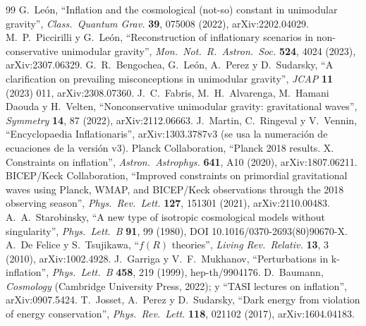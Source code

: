\documentclass[11pt,a4paper]{article}
\numberwithin{equation}{section}
\begin{document}
\begin{thebibliography}{99}
\small
{} G.~León, ``Inflation and the cosmological (not-so) constant in unimodular gravity'', \emph{Class.\ Quantum Grav.} \textbf{39}, 075008 (2022), arXiv:2202.04029.
 M.~P.~Piccirilli y G.~León, ``Reconstruction of inflationary scenarios in non-conservative unimodular gravity'', \emph{Mon.\ Not.\ R.\ Astron.\ Soc.} \textbf{524}, 4024 (2023), arXiv:2307.06329.
 G.~R.~Bengochea, G.~León, A.~Perez y D.~Sudarsky, ``A clarification on prevailing misconceptions in unimodular gravity'', \emph{JCAP} \textbf{11} (2023) 011, arXiv:2308.07360.
 J.~C.~Fabris, M.~H.~Alvarenga, M.~Hamani Daouda y H.~Velten, ``Nonconservative unimodular gravity: gravitational waves'', \emph{Symmetry} \textbf{14}, 87 (2022), arXiv:2112.06663.
 J.~Martin, C.~Ringeval y V.~Vennin, ``Encyclopaedia Inflationaris'', arXiv:1303.3787v3 (se usa la numeración de ecuaciones de la versión v3).
 Planck Collaboration, ``Planck 2018 results. X. Constraints on inflation'', \emph{Astron.\ Astrophys.} \textbf{641}, A10 (2020), arXiv:1807.06211.
 BICEP/Keck Collaboration, ``Improved constraints on primordial gravitational waves using Planck, WMAP, and BICEP/Keck observations through the 2018 observing season'', \emph{Phys.\ Rev.\ Lett.} \textbf{127}, 151301 (2021), arXiv:2110.00483.
 A.~A.~Starobinsky, ``A new type of isotropic cosmological models without singularity'', \emph{Phys.\ Lett.\ B} \textbf{91}, 99 (1980), DOI 10.1016/0370-2693(80)90670-X.
 A.~De Felice y S.~Tsujikawa, ``$f(R)$ theories'', \emph{Living Rev.\ Relativ.} \textbf{13}, 3 (2010), arXiv:1002.4928.
 J.~Garriga y V.~F.~Mukhanov, ``Perturbations in k-inflation'', \emph{Phys.\ Lett.\ B} \textbf{458}, 219 (1999), hep-th/9904176.
 D.~Baumann, \emph{Cosmology} (Cambridge University Press, 2022); y ``TASI lectures on inflation'', arXiv:0907.5424.
 T.~Josset, A.~Perez y D.~Sudarsky, ``Dark energy from violation of energy conservation'', \emph{Phys.\ Rev.\ Lett.} \textbf{118}, 021102 (2017), arXiv:1604.04183.
\end{thebibliography}
\end{document}
